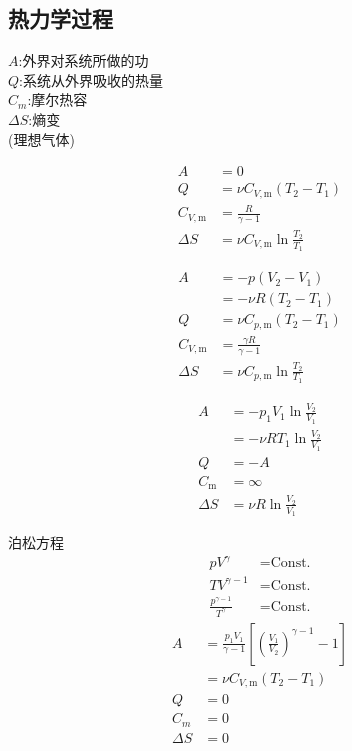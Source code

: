 \documentclass[10pt]{article}
\numberwithin{equation}{section}
\begin{document}
\begin{multicols}{3}
\begin{CJK}{UTF8}{gbsn}
\section{热力学过程}
$A$:外界对系统所做的功\\
$Q$:系统从外界吸收的热量\\
$C_m$:摩尔热容\\
$\Delta S$:熵变\\
(理想气体)
\begin{center}
\end{center}
\begin{align}
  A&=0 \\
  Q&=\nu C_{V,\textrm{m}}(T_2-T_1) \\
  C_{V,\textrm{m}}&=\frac{R}{\gamma-1} \\
  \Delta S&=\nu C_{V,\textrm{m}}\ln\frac{T_2}{T_1}
\end{align}
\begin{center}
\end{center}
\begin{align}
  A&=-p(V_{2}-V_{1})\nonumber \\ &=-\nu R(T_2-T_1) \\
  Q&=\nu C_{p,\textrm{m}}(T_2-T_1) \\
  C_{V,\textrm{m}}&=\frac{\gamma R}{\gamma-1} \\
  \Delta S&=\nu C_{p,\textrm{m}}\ln\frac{T_2}{T_1}
\end{align}
\begin{center}
\end{center}
\begin{align}
  A&=-p_1V_{1}\ln\frac{V_{2}}{V_{1}} \nonumber \\&=-\nu RT_1\ln\frac{V_{2}}{V_{1}} \\
  Q&=-A \\
  C_{\textrm{m}}&=\infty \\
  \Delta S&=\nu R\ln\frac{V_2}{V_1}
\end{align}
\begin{center}
\end{center}
泊松方程
\begin{align}
  pV^{\gamma}&=\textrm{Const.} \\
  TV^{\gamma-1}&=\textrm{Const.} \\
  \frac{p^{\gamma -1}}{T^{\gamma}}&=\textrm{Const.}
\end{align}
\begin{align}
  A&= \frac{p_1V_{1}}{\gamma -1}\left[\left(\frac{V_{1}}{V_{2}}\right)^{\gamma -1}-1\right]\nonumber\\ &=\nu C_{V,\textrm{m}}(T_2-T_1) \\
  Q&=0 \\
  C_m&=0 \\
  \Delta S&=0
\end{align}
\begin{center}
\end{center}


\end{CJK}
\end{multicols}
\end{document}

